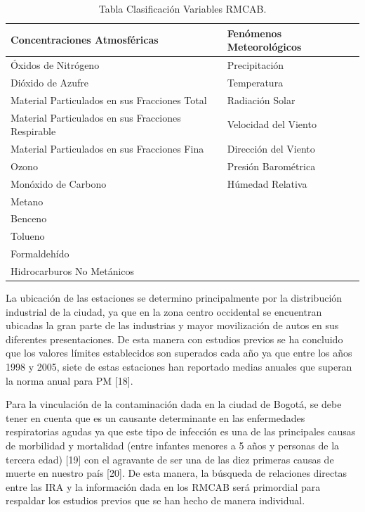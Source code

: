 \documentclass[a4paper, 12pt, oneside]{article}
\theoremstyle{definition}
\theoremstyle{remark}
\begin{document}
\begin{table}[htbp]
\begin{center}
\begin{tabular}{|l|l|}
\hline
Concentraciones Atmosféricas & Fenómenos  Meteorológicos \\
\hline \hline
Óxidos de Nitrógeno & Precipitación \\ \hline
Dióxido de Azufre & Temperatura \\ \hline
Material Particulados en sus Fracciones Total & Radiación Solar \\ \hline
Material Particulados en sus Fracciones Respirable & Velocidad del Viento \\ \hline
Material Particulados en sus Fracciones Fina & Dirección del Viento \\ \hline
Ozono & Presión Barométrica \\ \hline
Monóxido de Carbono & Húmedad Relativa \\ \hline
Metano &  \\ \hline
Benceno &  \\ \hline
Tolueno &  \\ \hline
Formaldehído &  \\ \hline
Hidrocarburos No Metánicos & \\ \hline
\end{tabular}
\caption{Tabla Clasificación Variables RMCAB.}
\label{tabla:sencilla}
\end{center}
\end{table}


La ubicación de las estaciones se determino principalmente por la distribución  industrial de la ciudad, ya que en la zona centro occidental se encuentran ubicadas la gran parte de las industrias y mayor movilización de autos en sus diferentes presentaciones. De esta manera con estudios previos se ha concluido que los valores límites establecidos son superados cada año ya que entre los años 1998 y 2005, siete de estas estaciones han reportado medias anuales que superan la norma anual para PM [18].

Para la vinculación de la contaminación dada en la ciudad de Bogotá, se debe tener en cuenta que es un causante determinante en las enfermedades respiratorias agudas ya que este tipo de infección es una de las principales causas de morbilidad y mortalidad (entre infantes menores a 5 años y personas de la tercera edad) [19] con el agravante de ser una de las diez primeras causas de muerte en nuestro país [20]. De esta manera, la búsqueda de relaciones directas entre las IRA y la información dada en los RMCAB será primordial para respaldar los estudios previos que se han hecho de manera individual. 
\end{document}
